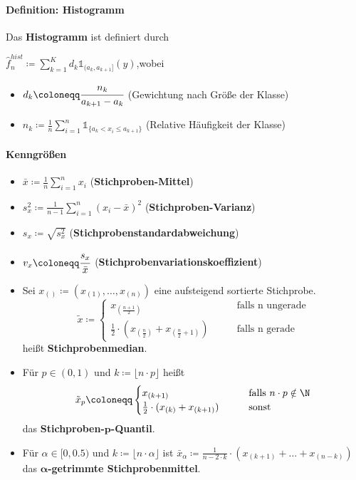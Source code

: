 \newpage
\paragraph{Definition: Histogramm}
Das \textbf{Histogramm} ist definiert durch
\begin{tightcenter}
	$\hat{f}_n^{hist}\coloneqq\sum\limits_{k=1}^{K}d_k\mathds{1}_{(a_k,a_{k+1}]}(y)$,\qquad wobei
	\begin{itemize}
		\item $d_k\coloneqq\cfrac{n_k}{a_{k+1}-a_k}$ (Gewichtung nach Größe der Klasse)
		\item $n_k\coloneqq\frac{1}{n}\sum\limits_{i=1}^{n}\mathds{1}_{\{a_k<x_i\leq a_{k+1}\}}$ (Relative Häufigkeit der Klasse)
	\end{itemize}
\end{tightcenter}

\paragraph{Kenngrößen}
\begin{itemize}
	\item $\bar{x}\coloneqq\frac{1}{n}\sum\limits_{i=1}^{n}x_i$ \qquad(\textbf{Stichproben-Mittel})
	\item $s_x^2\coloneqq\frac{1}{n-1}\sum\limits_{i=1}^{n}(x_i-\bar{x})^2$ \qquad(\textbf{Stichproben-Varianz})
	\item $s_x\coloneqq\sqrt{s_x^2}$ \qquad(\textbf{Stichprobenstandardabweichung})
	\item $v_x\coloneqq\cfrac{s_x}{\bar{x}}$ \qquad(\textbf{Stichprobenvariationskoeffizient})
	\item Sei $x_{()}\coloneqq(x_{(1)},\ldots,x_{(n)})$ eine aufsteigend sortierte Stichprobe.
	\[   
	\tilde{x}\coloneqq
	\begin{cases}
		x_{(\frac{n+1}{2})} & \qquad\text{falls n ungerade}\\
		\frac{1}{2}\cdot(x_{(\frac{n}{2})}+x_{(\frac{n}{2}+1)}) & \qquad\text{falls n gerade}
	\end{cases}
	\]
	heißt \textbf{Stichprobenmedian}.
	\item Für $p\in(0,1)$ und $k\coloneqq\lfloor n\cdot p\rfloor$ heißt
	\[   
	\tilde{x}_p\coloneqq
	\begin{cases}
		x_{(k+1)} & \qquad\text{falls }n\cdot p\notin\N\\
		\frac{1}{2}\cdot(x_{(k)}+x_{(k+1)}) & \qquad\text{sonst}
	\end{cases}
	\]
	das \textbf{Stichproben-$\boldsymbol{p}$-Quantil}.
	\item Für $\alpha\in[0,0.5)$ und $k\coloneqq\lfloor n\cdot \alpha\rfloor$ ist $\bar{x}_\alpha\coloneqq\frac{1}{n-2\cdot k}\cdot(x_{(k+1)}+\ldots+x_{(n-k)})$ das \textbf{$\boldsymbol{\alpha}$-getrimmte Stichprobenmittel}.
\end{itemize}

